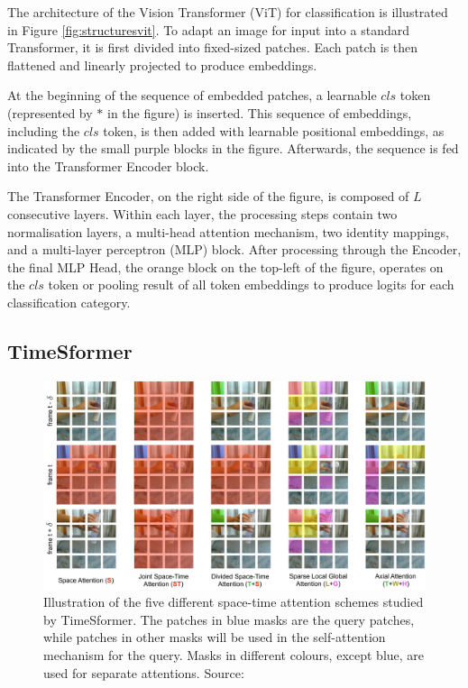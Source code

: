The architecture of the Vision Transformer (ViT) for classification is illustrated in Figure \ref{fig:structuresvit}. To adapt an image for input into a standard Transformer, it is first divided into fixed-sized patches. Each patch is then flattened and linearly projected to produce embeddings. 

At the beginning of the sequence of embedded patches, a learnable $cls$ token (represented by $*$ in the figure) is inserted. This sequence of embeddings, including the $cls$ token, is then added with learnable positional embeddings, as indicated by the small purple blocks in the figure. Afterwards, the sequence is fed into the Transformer Encoder block. 

The Transformer Encoder, on the right side of the figure, is composed of $L$ consecutive layers. Within each layer, the processing steps contain two normalisation layers, a multi-head attention mechanism, two identity mappings, and a multi-layer perceptron (MLP) block. After processing through the Encoder, the final MLP Head, the orange block on the top-left of the figure, operates on the $cls$ token or pooling result of all token embeddings to produce logits for each classification category.

\subsection{TimeSformer}
\begin{figure}[ht]
    \centering
    \includegraphics[width=1.0\textwidth]{assets/charts_rw/Timesformer}
    \caption[Five different space-time attention schemes studied by TimeSformer]{Illustration of the five different space-time attention schemes studied by TimeSformer. The patches in blue masks are the query patches, while patches in other masks will be used in the self-attention mechanism for the query. Masks in different colours, except blue, are used for separate attentions. Source: \parencite{bertasius2021space}}
    \label{fig:structurestimesformer}
\end{figure}

